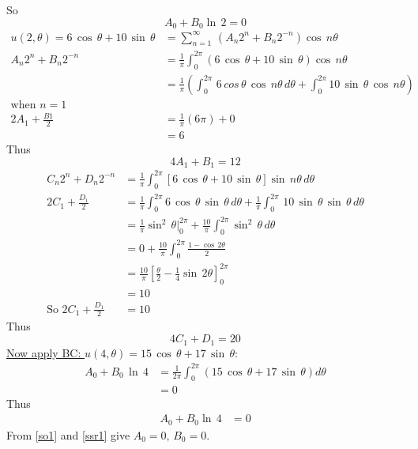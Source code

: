 So
\begin{equation}
A_0+B_0\ln\,2=0\label{sor1}
\end{equation}
\begin{align}
u(2,\theta)=6\,\cos\,\theta+ 10\,\sin\,\theta&=\sum_{n=1}^\infty\,(A_n2^n+B_n2^{-n})\cos\,n\theta\\
A_n2^n+B_n2^{-n}&=\frac{1}{\pi}\int_0^{2\pi}(6\,\cos\,\theta+10\,\sin\,\theta)\cos\,n\theta\\
&=\frac{1}{\pi}\left(\int_0^{2\pi}\,6\,cos\,\theta\,\cos\,n\theta\,d\theta+\int_0^{2\pi}10\,\sin\,\theta\,\cos\,n\theta\right)\\
\text{when}\,\,n=1&\\
2A_1+\frac{B1}{2}&=\frac{1}{\pi}(6\pi)+0\\
&=6
\end{align}
Thus 
\begin{equation}
4A_1+B_1=12\label{sor2}
\end{equation}
\begin{align*}
C_n2^n+D_n2^{-n}&=\frac{1}{\pi}\int_0^{2\pi}[6\,\cos\,\theta+10\,\sin\,\theta]\sin\,n\theta\,d\theta\\
2C_1+\frac{D_1}{2}&=\frac{1}{\pi}\int_0^{2\pi}6\,\cos\,\theta\,\sin\,\theta\,d\theta+\frac{1}{\pi}\int_0^{2\pi}\,10\,\sin\,\theta\,\sin\,\theta\,d\theta\\
&=\frac{1}{\pi}\sin^2\,\theta\big|_0^{2\pi}+\frac{10}{\pi}\int_0^{2\pi}\sin^2\,\theta\,d\theta\\
&=0+\frac{10}{\pi}\int_0^{2\pi}\frac{1-\cos\,2\theta}{2}\\
&=\frac{10}{\pi}\left[\frac{\theta}{2}-\frac{1}{4}\sin\,2\theta\right]_0^{2\pi}\\
&=10\\
\text{So}\,\,2C_1+\frac{D_1}{2}&=10
\end{align*}
Thus
\begin{equation}
4C_1+D_1=20\label{sorr1}
\end{equation}
\underline{Now apply BC: $u(4,\theta)=15\,\cos\,\theta+17\,\sin\,\theta$}:
\begin{align*}
A_0+B_0\, \ln\,4&=\frac{1}{2\pi}\int_0^{2\pi}(15\,\cos\,\theta+17\,\sin\,\theta)d\theta\\
&=0
\end{align*}
Thus
\begin{align}
A_0+B_0\ln\,4&=0\label{ssr1}
\end{align}
From \eqref{so1} and \eqref{ssr1} give $A_0=0,\,B_0=0$.\\
